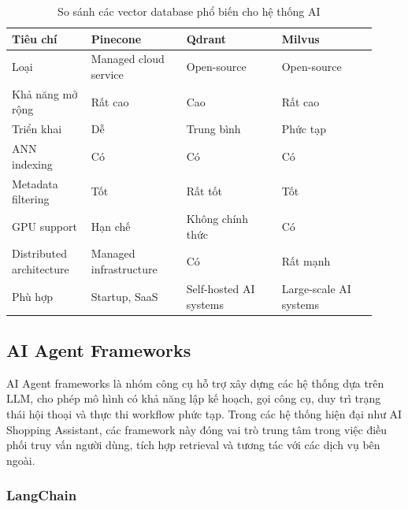 \begin{table}[H]
\centering
\caption{So sánh các vector database phổ biến cho hệ thống AI}
\label{tab:vector-db-comparison}
\renewcommand{\arraystretch}{1.3}

\begin{tabularx}{\linewidth}{
@{}
p{0.20\linewidth}
p{0.24\linewidth}
p{0.24\linewidth}
p{0.24\linewidth}
@{}
}
\toprule

\textbf{Tiêu chí} &
\textbf{Pinecone} &
\textbf{Qdrant} &
\textbf{Milvus} \\

\midrule

Loại &
Managed cloud service &
Open-source &
Open-source \\

Khả năng mở rộng &
Rất cao &
Cao &
Rất cao \\

Triển khai &
Dễ &
Trung bình &
Phức tạp \\

ANN indexing &
Có &
Có &
Có \\

Metadata filtering &
Tốt &
Rất tốt &
Tốt \\

GPU support &
Hạn chế &
Không chính thức &
Có \\

Distributed architecture &
Managed infrastructure &
Có &
Rất mạnh \\

Phù hợp &
Startup, SaaS &
Self-hosted AI systems &
Large-scale AI systems \\

\bottomrule
\end{tabularx}

\end{table}
\subsection{AI Agent Frameworks}

AI Agent frameworks là nhóm công cụ hỗ trợ xây dựng các hệ thống dựa trên LLM, cho phép mô hình có khả năng lập kế hoạch, gọi công cụ, duy trì trạng thái hội thoại và thực thi workflow phức tạp. Trong các hệ thống hiện đại như AI Shopping Assistant, các framework này đóng vai trò trung tâm trong việc điều phối truy vấn người dùng, tích hợp retrieval và tương tác với các dịch vụ bên ngoài.

\subsubsection{LangChain}

